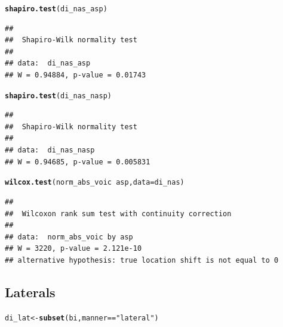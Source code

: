 \documentclass[a4paper,11pt]{article}\usepackage[]{graphicx}\usepackage[]{color}
\makeatletter
\newcommand{\hlstr}[1]{\textcolor[rgb]{0.192,0.494,0.8}{#1}}%
\newcommand{\hlopt}[1]{\textcolor[rgb]{0,0,0}{#1}}%
\newcommand{\hlstd}[1]{\textcolor[rgb]{0.345,0.345,0.345}{#1}}%
\newcommand{\hlkwb}[1]{\textcolor[rgb]{0.69,0.353,0.396}{#1}}%
\newcommand{\hlkwc}[1]{\textcolor[rgb]{0.333,0.667,0.333}{#1}}%
\newcommand{\hlkwd}[1]{\textcolor[rgb]{0.737,0.353,0.396}{\textbf{#1}}}%
\newenvironment{kframe}{%
 \def\at@end@of@kframe{}%
 \ifinner\ifhmode%
  \def\at@end@of@kframe{\end{minipage}}%
  \begin{minipage}{\columnwidth}%
 \fi\fi%
 \def\FrameCommand##1{\hskip\@totalleftmargin \hskip-\fboxsep
 \colorbox{shadecolor}{##1}\hskip-\fboxsep
     \hskip-\linewidth \hskip-\@totalleftmargin \hskip\columnwidth}%
 \MakeFramed {\advance\hsize-\width
   \@totalleftmargin\z@ \linewidth\hsize
   \@setminipage}}%
 {\par\unskip\endMakeFramed%
 \at@end@of@kframe}
\newenvironment{knitrout}{}{} %
\makeatother
\begin{document}
\begin{knitrout}
\color{fgcolor}\begin{kframe}
\begin{alltt}
\hlkwd{shapiro.test}\hlstd{(di_nas_asp)}
\end{alltt}
\begin{verbatim}
## 
## 	Shapiro-Wilk normality test
## 
## data:  di_nas_asp
## W = 0.94884, p-value = 0.01743
\end{verbatim}
\begin{alltt}
\hlkwd{shapiro.test}\hlstd{(di_nas_nasp)}
\end{alltt}
\begin{verbatim}
## 
## 	Shapiro-Wilk normality test
## 
## data:  di_nas_nasp
## W = 0.94685, p-value = 0.005831
\end{verbatim}
\begin{alltt}
\hlkwd{wilcox.test}\hlstd{(norm_abs_voic} \hlopt{~} \hlstd{asp,} \hlkwc{data} \hlstd{= di_nas)}
\end{alltt}
\begin{verbatim}
## 
## 	Wilcoxon rank sum test with continuity correction
## 
## data:  norm_abs_voic by asp
## W = 3220, p-value = 2.121e-10
## alternative hypothesis: true location shift is not equal to 0
\end{verbatim}
\end{kframe}
\end{knitrout}

\subsection{Laterals}

\begin{knitrout}
\color{fgcolor}\begin{kframe}
\begin{alltt}
\hlstd{di_lat} \hlkwb{<-} \hlkwd{subset}\hlstd{(bi, manner} \hlopt{==} \hlstr{"lateral"}\hlstd{)}
\end{alltt}
\end{kframe}
\end{knitrout}
\end{document}
